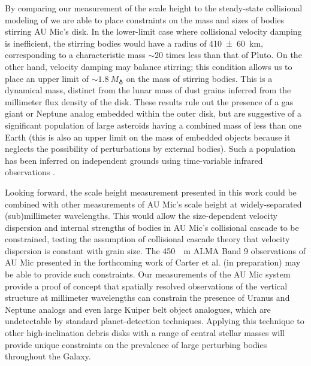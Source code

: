 \documentclass[modern]{aastex62}
\begin{document}
By comparing our measurement of the scale height to the steady-state collisional modeling of \citet{pan&schlichting12} we are able to place constraints on the mass
and sizes of bodies stirring AU Mic's disk.
In the lower-limit case where collisional velocity damping is inefficient, the stirring bodies would have a radius of \SI{410 \pm 60}{km}, corresponding to a characteristic mass $\sim 20$ times less than that of Pluto.
On the other hand, velocity damping may balance stirring; this condition allows us to place an upper limit of $\sim \SI{1.8}{M_\earth}$ on the mass of stirring bodies.
This is a dynamical mass, distinct from the lunar mass of dust grains inferred from the millimeter flux density of the disk.
These results rule out the presence of a gas giant or Neptune analog embedded 
within the outer disk, but are suggestive of a significant population of large asteroids having a combined mass of less than one Earth (this is also an upper limit on the mass of embedded objects because it neglects the possibility of perturbations
by external bodies). 
Such a population has been inferred on independent grounds using time-variable infrared observations \citep{chiang&fung17}.

Looking forward, the scale height measurement presented in this work could be combined with other measurements of AU Mic's scale height at widely-separated (sub)millimeter wavelengths.
This would allow the size-dependent velocity dispersion and internal strengths of bodies in AU Mic's collisional cascade to be constrained, testing the assumption of collisional cascade theory that velocity dispersion is constant with grain size.
The \SI{450}{\mu m} ALMA Band 9 observations of AU Mic presented in the forthcoming work of Carter et al. (in preparation) may be able to provide such constraints.
Our measurements of the AU Mic system provide a proof of concept that spatially resolved observations of the vertical structure at millimeter wavelengths can constrain the presence of Uranus and Neptune analogs and even large Kuiper belt object analogues, which are undetectable by standard planet-detection techniques.  
Applying this technique to other high-inclination debris disks with a range of central stellar masses will provide unique constraints on the prevalence of large perturbing bodies throughout the Galaxy.
\end{document}
